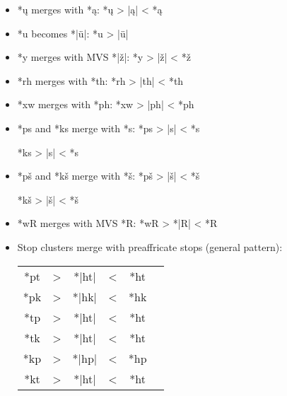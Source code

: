 \documentclass[output=paper]{LSP/langsci}
\begin{document}
\begin{itemize}
\item *\k{u} merges with *\k{a}: \hspace{3.1em} *\k{u}	>	|\k{a}|	<	*\k{a}
\item *u becomes *|\"u|:	 \hspace{4.1em} *u	>	|\"u|
\item *y merges with MVS *|\v{z}|: \hspace{1em} *y	>	|\v{z}|	<	*\v{z}
\item *rh merges with *th: \hspace{3em} *rh	>	|th|	<	*th
\item *xw merges with *ph:	\hspace{ 3em} *xw	>	|ph|	<	*ph
\item *ps and *ks merge with *s: \hspace{1em} *ps	>	|s|	<	*s

\hspace{12em} *ks	>	|s|	<	*s
\item *pš and *kš merge with *š: \hspace{1em} *pš	>	|š|	<	*š

\hspace{12em} *kš	>	|š|	<	*š
\item *wR merges with MVS *R: \hspace{1em} *wR	>	*|R|	<	*R
\item Stop clusters merge with preaffricate stops (general pattern):	


\begin{tabular}[t]{c c c c c c }
*pt & > & *|ht| & < & *ht \\
*pk	& > & *|hk| & < & *hk \\
*tp & > & *|ht| & < & *ht \\
*tk & > & *|ht| & < & *ht \\
*kp	& >	 & *|hp|	& <	& *hp \\
*kt	& >	& *|ht| & < & *ht \\
\end{tabular}
\end{itemize} 
 
\end{document}
